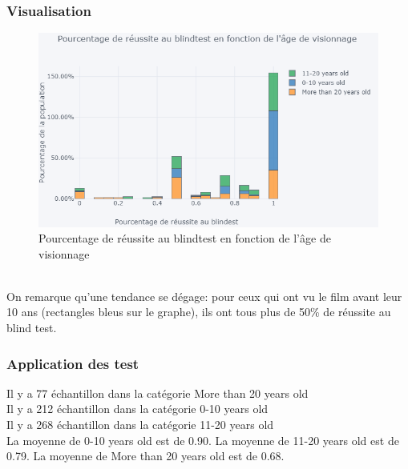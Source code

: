 \documentclass{article} %
\begin{document}
\subsubsection{Visualisation}

\begin{figure}[!h]
	\includegraphics[keepaspectratio,scale=0.6]{h8.png}
	\caption{Pourcentage de réussite au blindtest en fonction de l'âge de visionnage}
\end{figure}~\\
On remarque qu’une tendance se dégage: pour ceux qui ont vu le film avant leur 10 ans (rectangles bleus sur le graphe), ils ont tous plus de 50\% de réussite au blind test. 
\subsubsection{ Application des test}
Il y a 77 échantillon dans la catégorie More than 20 years old\\
Il y a 212 échantillon dans la catégorie 0-10 years old\\
Il y a 268 échantillon dans la catégorie 11-20 years old\\
La moyenne de 0-10 years old est de 0.90. La moyenne de 11-20 years old est de 0.79. La moyenne de More than 20 years old est de 0.68.



\imtaMakeCover
\end{document}

